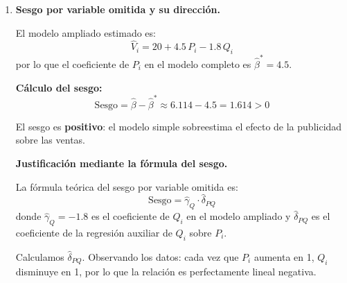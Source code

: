 \documentclass[10pt,a4paper]{article}
\begin{document}
\begin{enumerate}
\begin{enumerate}[label=(\alph*)]
{\begin{enumerate}[label=(\alph*)]
Aplicando la fórmula MCO:
 
\[
\boxed{\hat{\beta}
= \frac{\displaystyle\sum_{i=1}^6 (P_i-\bar{P})(V_i-\bar{V})}
       {\displaystyle\sum_{i=1}^6 (P_i-\bar{P})^2}
= \frac{107.0}{17.5} \approx 6.114}
\]
 
El intercepto:
 
\[
\hat{\alpha} = \bar{V} - \hat{\beta}\,\bar{P}
= 47.33 - 6.114 \times 4.5
= 47.33 - 27.51 \approx 19.82
\]
 
Por tanto, el modelo simple estimado es:
 
\[
\hat{V}_i = 19.82 + 6.114\, P_i
\]
 
\textbf{Interpretación de $\hat{\beta}$:} Un aumento de 1 unidad en el gasto en publicidad
(es decir, 100 mil pesos adicionales) se asocia, en promedio, con un incremento de
\textbf{6.114 millones de pesos} en las ventas mensuales, manteniendo todo lo demás
constante (en este modelo, sin controles adicionales).
 
\item \textbf{Sesgo por variable omitida y su dirección.}
 
\medskip
El modelo ampliado estimado es:
\[
\hat{V}_i = 20 + 4.5\, P_i - 1.8\, Q_i
\]
por lo que el coeficiente de $P_i$ en el modelo completo es $\hat{\beta}^* = 4.5$.
 
\textbf{Cálculo del sesgo:}
\[
\boxed{\text{Sesgo} = \hat{\beta} - \hat{\beta}^* \approx 6.114 - 4.5 = 1.614 > 0}
\]
 
El sesgo es \textbf{positivo}: el modelo simple sobreestima el efecto de la publicidad
sobre las ventas.
 
\medskip
\textbf{Justificación mediante la fórmula del sesgo.}
 
La fórmula teórica del sesgo por variable omitida es:
\[
\text{Sesgo} = \hat{\gamma}_Q \cdot \hat{\delta}_{PQ}
\]
donde $\hat{\gamma}_Q = -1.8$ es el coeficiente de $Q_i$ en el modelo ampliado y
$\hat{\delta}_{PQ}$ es el coeficiente de la regresión auxiliar de $Q_i$ sobre $P_i$.
 
Calculamos $\hat{\delta}_{PQ}$. Observando los datos: cada vez que $P_i$ aumenta en 1,
$Q_i$ disminuye en 1, por lo que la relación es perfectamente lineal negativa.
 

\end{enumerate}}
\end{enumerate}
\end{enumerate}
\end{document}
